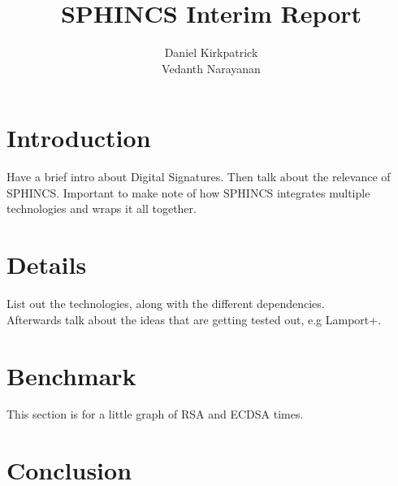 \documentclass[]{scrartcl}
\title{SPHINCS Interim Report}
\author{Daniel Kirkpatrick\\Vedanth Narayanan}
\begin{document}
\maketitle


\section*{Introduction}
Have a brief intro about Digital Signatures. Then talk about the relevance of SPHINCS. Important to make note of how SPHINCS integrates multiple technologies and wraps it all together.

\section*{Details}
List out the technologies, along with the different dependencies.\\
Afterwards talk about the ideas that are getting tested out, e.g Lamport+.

\section*{Benchmark}
This section is for a little graph of RSA and ECDSA times.

\section*{Conclusion}
\end{document}
